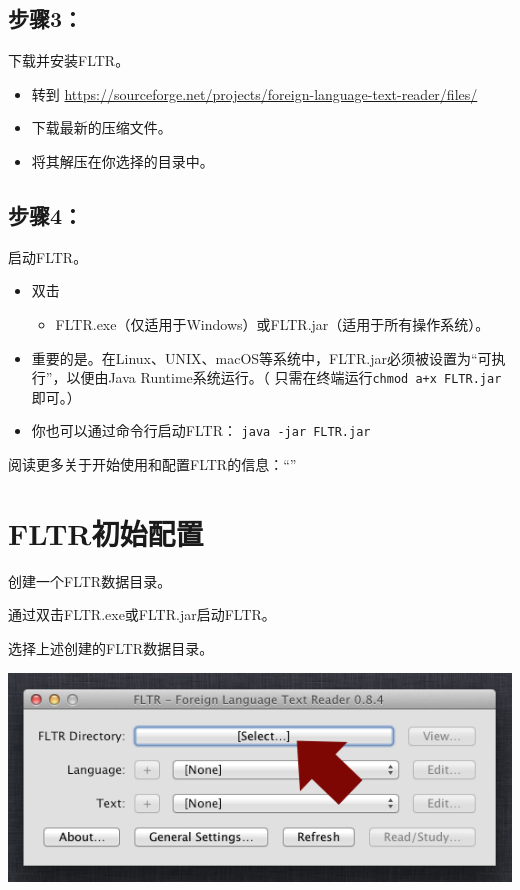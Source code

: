 \documentclass[cn,10pt,math=newtx,citestyle=gb7714-2015,bibstyle=gb7714-2015]{elegantbook}
\begin{document}
\section*{步骤3：}
 下载并安装FLTR。
\begin{itemize}
    \item   转到 \url{https://sourceforge.net/projects/foreign-language-text-reader/files/} 
    \item 下载最新的压缩文件。
    \item 将其解压在你选择的目录中。
\end{itemize}

\section*{步骤4：}
启动FLTR。
\begin{itemize}

\item 双击
 \begin{itemize}\item FLTR.exe（仅适用于Windows）或FLTR.jar（适用于所有操作系统）。
 \end{itemize}

    \item 重要的是。在Linux、UNIX、macOS等系统中，FLTR.jar必须被设置为“可执行”，以便由Java Runtime系统运行。（ 只需在终端运行\lstinline{chmod a+x FLTR.jar}即可。）
    \item 你也可以通过命令行启动FLTR： \lstinline{java -jar FLTR.jar}
       
\end{itemize} 

阅读更多关于开始使用和配置FLTR的信息：“”


\chapter{FLTR初始配置}
\label{FLTR初始配置}
创建一个FLTR数据目录。

通过双击FLTR.exe或FLTR.jar启动FLTR。

选择上述创建的FLTR数据目录。

\includegraphics[scale=0.6]{image/images-017.png}
\end{document}
